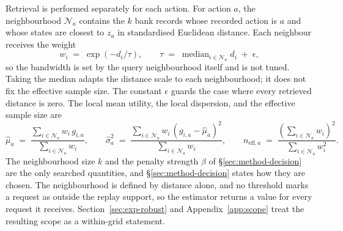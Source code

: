 \documentclass{article}
\newcommand{\calN}{\mathcal{N}}
\begin{document}
Retrieval is performed separately for each action. For action $a$, the neighbourhood
$\calN_a$ contains the $k$ bank records whose recorded action is $a$ and whose states are
closest to $z_a$ in standardised Euclidean distance. Each neighbour receives the weight
\begin{equation}
  w_i \;=\; \exp\!\left(-d_i / \tau\right),
  \qquad
  \tau \;=\; \operatorname{median}_{i \in \calN_a} d_i \;+\; \epsilon ,
  \label{eq:weights}
\end{equation}
so the bandwidth is set by the query neighbourhood itself and is not tuned. Taking the median
adapts the distance scale to each neighbourhood; it does not fix the effective sample size.
The constant $\epsilon$ guards the case where every retrieved distance is zero. The local mean
utility, the local dispersion, and the effective sample size are
\begin{equation}
  \hat\mu_a \;=\; \frac{\sum_{i \in \calN_a} w_i\, g_{i,a}}{\sum_{i \in \calN_a} w_i},
  \qquad
  \hat\sigma_a^{2} \;=\; \frac{\sum_{i \in \calN_a} w_i\, (g_{i,a} - \hat\mu_a)^{2}}{\sum_{i \in \calN_a} w_i},
  \qquad
  n_{\mathrm{eff},a} \;=\; \frac{\left(\sum_{i \in \calN_a} w_i\right)^{2}}{\sum_{i \in \calN_a} w_i^{2}} .
  \label{eq:local-moments}
\end{equation}
The neighbourhood size $k$ and the penalty strength $\beta$ of \S\ref{sec:method-decision} are
the only searched quantities, and \S\ref{sec:method-decision} states how they are chosen. The
neighbourhood is defined by distance alone, and no threshold marks a request as outside the
replay support, so the estimator returns a value for every request it receives.
Section~\ref{sec:exp-robust} and Appendix~\ref{app:scope} treat the resulting scope as a
within-grid statement.
\end{document}
